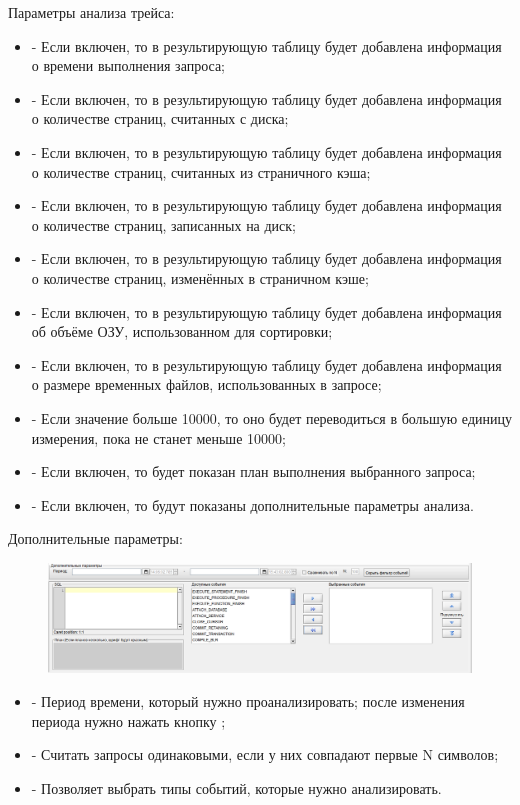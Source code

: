 Параметры анализа трейса:
\begin{itemize}
	\item {} - Если включен, то в результирующую таблицу будет добавлена информация о времени выполнения запроса;
	\item {} - Если включен, то в результирующую таблицу будет добавлена информация о количестве страниц, считанных с диска;
	\item {} -  Если включен, то в результирующую таблицу будет добавлена информация о количестве страниц, считанных из страничного кэша;
	\item {} - Если включен, то в результирующую таблицу будет добавлена информация о количестве страниц, записанных на диск;
	\item {} - Если включен, то в результирующую таблицу будет добавлена информация о количестве страниц, изменённых в страничном кэше;
	\item {} - Если включен, то в результирующую таблицу будет добавлена информация об объёме ОЗУ, использованном для сортировки;
	\item {} - Если включен, то в результирующую таблицу будет добавлена информация о размере временных файлов, использованных в запросе;
	\item {} - Если значение больше 10000, то оно будет переводиться в большую единицу измерения, пока не станет меньше 10000;
	\item {} - Если включен, то будет показан план выполнения выбранного запроса;
	\item {} - Если включен, то будут показаны дополнительные параметры анализа.
\end{itemize}

Дополнительные параметры:
\begin{figure}[H]
	\centering
	\includegraphics[width = 1\linewidth]{img/trace_analysis_additional_parameters.png}
\end{figure}
\begin{itemize}
	\item {} - Период времени, который нужно проанализировать; после изменения периода нужно нажать кнопку ;
	\item {} - Считать запросы одинаковыми, если у них совпадают первые N символов;
	\item {} - Позволяет выбрать типы событий, которые нужно анализировать.
\end{itemize}

